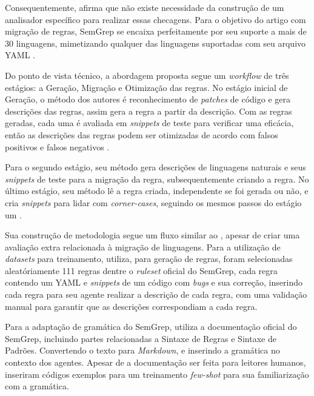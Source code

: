 \documentclass[
    12pt,                %
    openright,           %
    oneside,             %
    a4paper,             %
    english,             %
    brazil               %
]{abntex2}
\begin{document}
\par
Consequentemente,  afirma que não existe necessidade da construção de um analisador específico para realizar essas checagens.
Para o objetivo do artigo com migração de regras, SemGrep se encaixa perfeitamente por seu suporte a mais de 30 linguagens, mimetizando qualquer das linguagens suportadas com seu arquivo YAML \cite{hou2025generation}.
\par
Do ponto de vista técnico, a abordagem proposta segue um \textit{workflow} de três estágios: a Geração, Migração e Otimização das regras.
No estágio inicial de Geração, o método dos autores é reconhecimento de \textit{patches} de código e gera descrições das regras, assim gera a regra a partir da descrição.
Com as regras geradas, cada uma é avaliada em \textit{snippets} de teste para verificar uma eficácia, então as descrições das regras podem ser otimizadas de acordo com falsos positivos e falsos negativos \cite{hou2025generation}.
\par
Para o segundo estágio, seu método gera descrições de linguagens naturais e seus \textit{snippets} de teste para a migração da regra, subsequentemente criando a regra.
No último estágio, seu método lê a regra criada, independente se foi gerada ou não, e cria \textit{snippets} para lidar com \textit{corner-cases}, seguindo os mesmos passos do estágio um \cite{hou2025generation}.
\par
Sua construção de metodologia segue um fluxo similar ao , apesar de criar uma avaliação extra relacionada à migração de linguagens.
Para a utilização de \textit{datasets} para treinamento,  utiliza, para geração de regras, foram selecionadas aleatóriamente 111 regras dentre o \textit{ruleset} oficial do SemGrep, cada regra contendo um YAML e \textit{snippets} de um código com \textit{bugs} e sua correção, inserindo cada regra para seu agente realizar a descrição de cada regra, com uma validação manual para garantir que as descrições correspondiam a cada regra.
\par
Para a adaptação de gramática do SemGrep,  utiliza a documentação oficial do SemGrep, incluindo partes relacionadas a Sintaxe de Regras e Sintaxe de Padrões. Convertendo o texto para \textit{Markdown}, e inserindo a gramática no contexto dos agentes.
Apesar de a documentação ser feita para leitores humanos,  inseriram códigos exemplos para um treinamento \textit{few-shot} para sua familiarização com a gramática.
\end{document}
